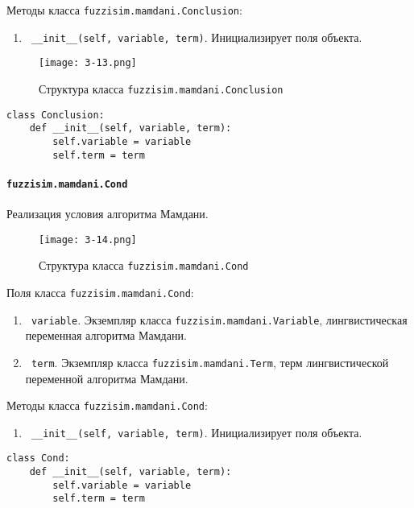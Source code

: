 Методы класса \lstinline!fuzzisim.mamdani.Conclusion!:
\begin{enumerate}[label=\arabic*)]
	\item \lstinline! __init__(self, variable, term)!. Инициализирует поля объекта.
\end{enumerate}


\begin{figure}[ht]
	\centering
	\texttt{[image: 3-13.png]}
	\caption{ Структура класса \lstinline!fuzzisim.mamdani.Conclusion!}
\end{figure}

\begin{lstlisting}[style=pythonstyle,caption={  }, label=lst:func:1]
class Conclusion:
	def __init__(self, variable, term):
		self.variable = variable
		self.term = term
\end{lstlisting}


\paragraph{\lstinline!fuzzisim.mamdani.Cond!}

Реализация условия алгоритма Мамдани.

\begin{figure}[ht]
	\centering
	\texttt{[image: 3-14.png]}
	\caption{ Структура класса \lstinline!fuzzisim.mamdani.Cond!}
\end{figure}

Поля класса \lstinline!fuzzisim.mamdani.Cond!:
\begin{enumerate}[label=\arabic*)]
	\item \lstinline! variable!. Экземпляр класса  \lstinline!fuzzisim.mamdani.Variable!, лингвистическая переменная алгоритма Мамдани.
	\item \lstinline! term!.   Экземпляр класса  \lstinline!fuzzisim.mamdani.Term!, терм лингвистической переменной алгоритма Мамдани.
\end{enumerate}


Методы класса \lstinline!fuzzisim.mamdani.Cond!:
\begin{enumerate}[label=\arabic*)]
	\item \lstinline! __init__(self, variable, term)!. Инициализирует поля объекта.
\end{enumerate}

\begin{lstlisting}[style=pythonstyle,caption={  }, label=lst:func:1]
class Cond:
	def __init__(self, variable, term):
		self.variable = variable
		self.term = term
\end{lstlisting}



